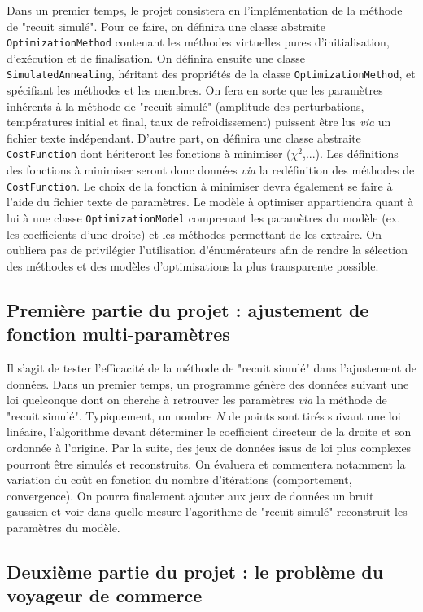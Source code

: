 \documentclass[10pt,a4paper,twoside]{report}
\begin{document}
Dans un premier temps, le projet consistera en l'implémentation de la
méthode de "recuit simulé". Pour ce faire, on définira une classe
abstraite \lstinline$OptimizationMethod$ contenant les méthodes
virtuelles pures d'initialisation, d'exécution et de finalisation. On
définira ensuite une classe \lstinline$SimulatedAnnealing$, héritant
des propriétés de la classe \lstinline$OptimizationMethod$, et
spécifiant les métho\-des et les membres. On fera en sorte que les
paramètres inhérents à la méthode de "recuit simulé" (amplitude des
perturbations, températures initial et final, taux de refroidissement)
puissent être lus \emph{via} un fichier texte indépendant. D'autre
part, on définira une classe abstraite \lstinline$CostFunction$ dont
hériteront les fonctions à minimiser ($\chi^2$,...). Les définitions
des fonctions à minimiser seront donc données \emph{via} la
redéfinition des méthodes de \lstinline$CostFunction$. Le choix de la
fonction à minimiser devra également se faire à l'aide du fichier
texte de paramètres. Le modèle à optimiser appartiendra quant à lui à
une classe \lstinline$OptimizationModel$ comprenant les paramètres du
modèle (ex. les coefficients d'une droite) et les méthodes permettant
de les extraire. On oubliera pas de privilégier l'utilisation
d'énumérateurs afin de rendre la sélection des méthodes et des modèles
d'optimisations la plus transparente possible.

\subsection{Première partie du projet : ajustement de fonction multi-paramètres}

Il s'agit de tester l'efficacité de la méthode de "recuit simulé"
dans l'ajustement de données. Dans un premier temps, un programme
génère des données suivant une loi quelconque dont on cherche à
retrouver les paramètres \emph{via} la méthode de "recuit
simulé". Typiquement, un nombre $N$ de points sont tirés suivant une
loi linéaire, l'algorithme devant déterminer le coefficient directeur
de la droite et son ordonnée à l'origine. Par la suite, des jeux de
données issus de loi plus complexes pourront être simulés et
reconstruits. On évaluera et commentera notamment la variation du coût
en fonction du nombre d'itérations (comportement, convergence). On
pourra finalement ajouter aux jeux de données un bruit gaussien et
voir dans quelle mesure l'agorithme de "recuit simulé" reconstruit
les paramètres du modèle.

\subsection{Deuxième partie du projet : le problème du voyageur de commerce}
\end{document}
